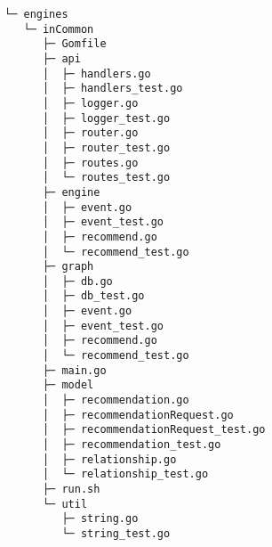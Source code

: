 \begin{codebox}
\begin{verbatim}
└─ engines
   └─ inCommon
      ├─ Gomfile
      ├─ api
      │  ├─ handlers.go
      │  ├─ handlers_test.go
      │  ├─ logger.go
      │  ├─ logger_test.go
      │  ├─ router.go
      │  ├─ router_test.go
      │  ├─ routes.go
      │  └─ routes_test.go
      ├─ engine
      │  ├─ event.go
      │  ├─ event_test.go
      │  ├─ recommend.go
      │  └─ recommend_test.go
      ├─ graph
      │  ├─ db.go
      │  ├─ db_test.go
      │  ├─ event.go
      │  ├─ event_test.go
      │  ├─ recommend.go
      │  └─ recommend_test.go
      ├─ main.go
      ├─ model
      │  ├─ recommendation.go
      │  ├─ recommendationRequest.go
      │  ├─ recommendationRequest_test.go
      │  ├─ recommendation_test.go
      │  ├─ relationship.go
      │  └─ relationship_test.go
      ├─ run.sh
      └─ util
         ├─ string.go
         └─ string_test.go

\end{verbatim}
\end{codebox}

